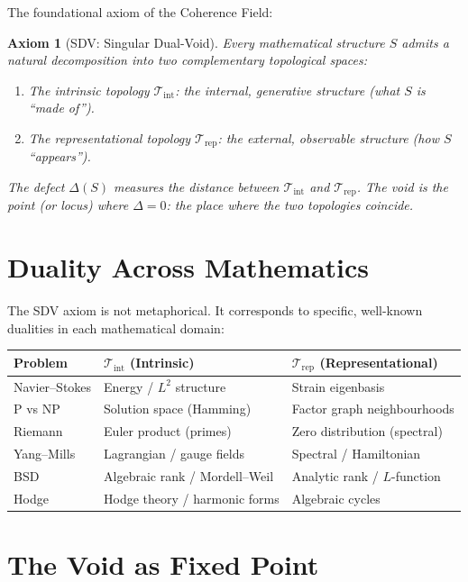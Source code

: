 \documentclass[12pt, openany]{book}
\newtheorem{axiom}[theorem]{Axiom}
\theoremstyle{remark}
\newcommand{\Tint}{\mathcal{T}_{\mathrm{int}}}
\newcommand{\Trep}{\mathcal{T}_{\mathrm{rep}}}
\begin{document}
The foundational axiom of the Coherence Field:

\begin{axiom}[SDV: Singular Dual-Void]
\label{ax:sdv}
Every mathematical structure $S$ admits a natural decomposition into two complementary
topological spaces:
\begin{enumerate}
  \item The \emph{intrinsic topology} $\Tint$: the internal, generative structure
        (what $S$ is ``made of'').
  \item The \emph{representational topology} $\Trep$: the external, observable structure
        (how $S$ ``appears'').
\end{enumerate}
The defect $\Delta(S)$ measures the distance between $\Tint$ and $\Trep$.
The \emph{void} is the point (or locus) where $\Delta = 0$: the place where the
two topologies coincide.
\end{axiom}

\section{Duality Across Mathematics}

The SDV axiom is not metaphorical. It corresponds to specific, well-known
dualities in each mathematical domain:

\begin{center}
\begin{tabular}{lll}
\toprule
\textbf{Problem} & \textbf{$\Tint$ (Intrinsic)} & \textbf{$\Trep$ (Representational)} \\
\midrule
Navier--Stokes & Energy / $L^2$ structure & Strain eigenbasis \\
P vs NP & Solution space (Hamming) & Factor graph neighbourhoods \\
Riemann & Euler product (primes) & Zero distribution (spectral) \\
Yang--Mills & Lagrangian / gauge fields & Spectral / Hamiltonian \\
BSD & Algebraic rank / Mordell--Weil & Analytic rank / $L$-function \\
Hodge & Hodge theory / harmonic forms & Algebraic cycles \\
\bottomrule
\end{tabular}
\end{center}

\section{The Void as Fixed Point}
\end{document}
